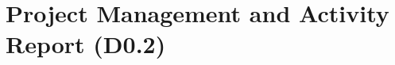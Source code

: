 \chapter{Project Management and Activity Report (D0.2)}
\label{chap:management}
\label{sec:management-scope}


